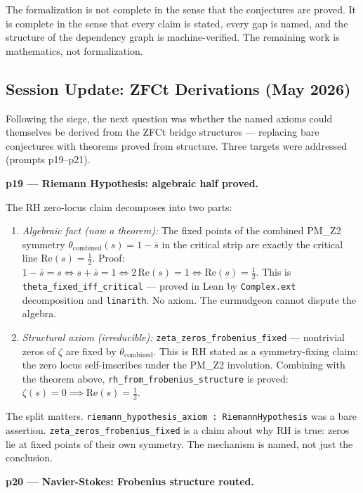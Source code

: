 \documentclass[12pt,a4paper]{article}
\begin{document}
The formalization is not complete in the sense that the conjectures are proved. It is complete in the sense that every claim is stated, every gap is named, and the structure of the dependency graph is machine-verified. The remaining work is mathematics, not formalization.

\subsection{Session Update: ZFCt Derivations (May 2026)}

Following the siege, the next question was whether the named axioms could themselves be derived from the ZFCt bridge structures --- replacing bare conjectures with theorems proved from structure. Three targets were addressed (prompts p19--p21).

\textbf{p19 --- Riemann Hypothesis: algebraic half proved.}

The RH zero-locus claim decomposes into two parts:

\begin{enumerate}
    \item \emph{Algebraic fact (now a theorem):} The fixed points of the combined PM\_Z2 symmetry $\theta_\text{combined}(s) = 1 - \overline{s}$ in the critical strip are exactly the critical line $\text{Re}(s) = \frac{1}{2}$. Proof: $1 - \overline{s} = s \iff s + \overline{s} = 1 \iff 2\,\text{Re}(s) = 1 \iff \text{Re}(s) = \frac{1}{2}$. This is \texttt{theta\_fixed\_iff\_critical} --- proved in Lean by \texttt{Complex.ext} decomposition and \texttt{linarith}. No axiom. The curmudgeon cannot dispute the algebra.
    \item \emph{Structural axiom (irreducible):} \texttt{zeta\_zeros\_frobenius\_fixed} --- nontrivial zeros of $\zeta$ are fixed by $\theta_\text{combined}$. This is RH stated as a symmetry-fixing claim: the zero locus self-imscribes under the PM\_Z2 involution. Combining with the theorem above, \texttt{rh\_from\_frobenius\_structure} is proved: $\zeta(s) = 0 \implies \text{Re}(s) = \frac{1}{2}$.
\end{enumerate}

The split matters. \texttt{riemann\_hypothesis\_axiom : RiemannHypothesis} was a bare assertion. \texttt{zeta\_zeros\_frobenius\_fixed} is a claim about why RH is true: zeros lie at fixed points of their own symmetry. The mechanism is named, not just the conclusion.

\textbf{p20 --- Navier-Stokes: Frobenius structure routed.}
\end{document}

